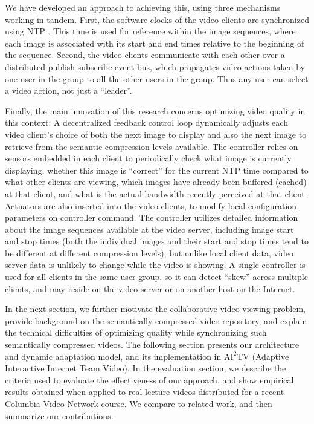 \documentclass{sig-alternate}
\begin{document}
We have developed an approach to achieving this, using three
mechanisms working in tandem.  First, the software clocks of the video
clients are synchronized using NTP \cite{NTP}.  This time is used for
reference within the image sequences, where each image is associated
with its start and end times relative to the beginning of the
sequence.  Second, the video clients communicate with each other over
a distributed publish-subscribe event bus, which propagates video
actions taken by one user in the group to all the other users in the
group.  Thus any user can select a video action, not just a
``leader''.

Finally, the main innovation of this research concerns optimizing
video quality in this context: A decentralized feedback control loop
dynamically adjusts each video client's choice of both the next image
to display and also the next image to retrieve from the semantic
compression levels available.  The controller relies on sensors
embedded in each client to periodically check what image is currently
displaying, whether this image is ``correct'' for the current NTP time
compared to what other clients are viewing, which images have already
been buffered (cached) at that client, and what is the actual
bandwidth recently perceived at that client.  Actuators are also
inserted into the video clients, to modify local configuration
parameters on controller command. The controller utilizes detailed
information about the image sequences available at the video server,
including image start and stop times (both the individual images and
their start and stop times tend to be different at different
compression levels), but unlike local client data, video server data
is unlikely to change while the video is showing.  A single controller
is used for all clients in the same user group, so it can detect
``skew'' across multiple clients, and may reside on the video server
or on another host on the Internet.

In the next section, we further motivate the collaborative video
viewing problem, provide background on the semantically compressed
video repository, and explain the technical difficulties of optimizing
quality while synchronizing such semantically compressed videos. The
following section presents our architecture and dynamic adaptation
model, and its implementation in $\mathrm{AI}^2$TV (Adaptive
Interactive Internet Team Video).  In the evaluation section, we
describe the criteria used to evaluate the effectiveness of our
approach, and show empirical results obtained when applied to real
lecture videos distributed for a recent Columbia Video Network
course. We compare to related work, and then summarize our
contributions.
\end{document}
